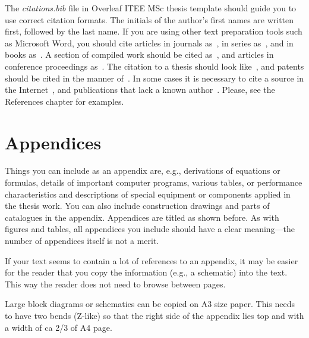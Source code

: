 The \textit{citations.bib} file in Overleaf ITEE MSc thesis template should guide you to use correct citation formats. The initials of the author's first names are written first, followed by the last name. If you are using other text preparation tools such as Microsoft Word, you should cite articles in journals  as~\cite{ojala:2002}, in series as~\cite{riekki:1998}, and in books as~\cite[p. 55]{pietikainen:2011}. A section of compiled work should be cited as~\cite{cvejic:2005}, and articles in conference proceedings as~\cite{heikkila:1997}. The citation to a thesis should look like~\cite{heikkinen:2011}, and patents should be cited in the manner of~\cite{toivonen:2004}. In some cases it is necessary to cite a source in the Internet~\cite{korpela}, and publications that lack a known author~\cite{asuntoliitto_asumistaso_1969}. Please, see the References chapter for examples.

\section{Appendices}
\label{sec:appendices}
Things you can include as an appendix are, e.g., derivations of equations or formulas, details of important computer programs, various tables, or performance characteristics and descriptions of special equipment or components applied in the thesis work. You can also include construction drawings and parts of catalogues in the appendix. Appendices are titled as shown before. As with figures and tables, all appendices you include should have a clear meaning---the number of appendices itself is not a merit.

If your text seems to contain a lot of references to an appendix, it may be easier for the reader that you copy the information (e.g., a schematic) into the text. This way the reader does not need to browse between pages.

Large block diagrams or schematics can be copied on A3 size paper. This needs to have two bends (Z-like) so that the right side of the appendix lies top and with a width of ca 2/3 of A4 page.
